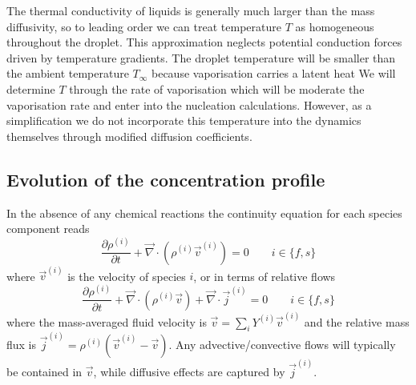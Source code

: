 \documentclass[11pt,twoside]{report}
\begin{document}
The thermal conductivity of liquids is generally much larger than the mass diffusivity, so to leading order we can treat temperature $T$ as homogeneous throughout the droplet.
This approximation neglects potential conduction forces driven by temperature gradients.
The droplet temperature will be smaller than the ambient temperature $T_\infty$ because vaporisation carries a latent heat
We will determine $T$ through the rate of vaporisation which will be moderate the vaporisation rate and enter into the nucleation calculations.
However, as a simplification we do not incorporate this temperature into the dynamics themselves through modified diffusion coefficients.

\subsection{Evolution of the concentration profile}

In the absence of any chemical reactions the continuity equation for each species component reads
\begin{equation}\label{eq:species-continuity}
  \frac{\partial \rho^{(i)}}{\partial t} +
  \vec{\nabla} \cdot (\rho^{(i)} \vec{v}^{(i)}) = 0
  \qquad i \in \{f,s\}
\end{equation}
where $\vec{v}^{(i)}$ is the velocity of species $i$, or in terms of relative flows
\begin{equation}\label{eq:species-continuity-relative}
  \frac{\partial \rho^{(i)}}{\partial t} +
  \vec{\nabla} \cdot (\rho^{(i)} \vec{v}) +
  \vec{\nabla} \cdot \vec{j}^{(i)} = 0
  \qquad i \in \{f,s\}
\end{equation}
where the mass-averaged fluid velocity is $\vec{v} = \sum_i Y^{(i)} \vec{v}^{(i)}$ and the relative mass flux is $\vec{j}^{(i)} = \rho^{(i)} (\vec{v}^{(i)} - \vec{v})$.
Any advective/convective flows will typically be contained in $\vec{v}$, while diffusive effects are captured by $\vec{j}^{(i)}$.
\end{document}
